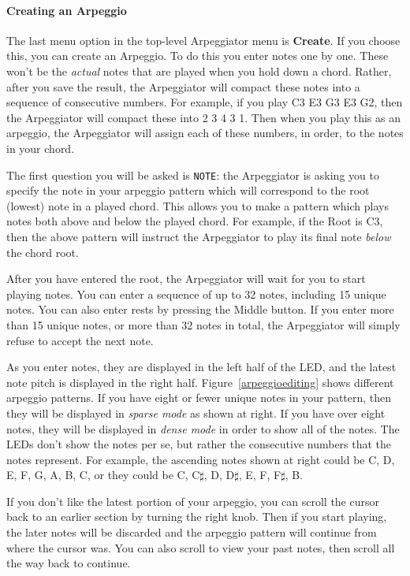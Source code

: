 \documentclass{article}
\begin{document}
\paragraph{Creating an Arpeggio}

The last menu option in the top-level Arpeggiator menu is {\bf Create}.  If you choose this, you can create an Arpeggio.  To do this you enter notes one by one.  These won't be the {\it actual} notes that are played when you hold down a chord.  Rather, after you save the result, the Arpeggiator will compact these notes into a sequence of consecutive numbers.  For example, if you play C3 E3 G3 E3 G2, then the Arpeggiator will compact these into 2 3 4 3 1.  Then when you play this as an arpeggio, the Arpeggiator will assign each of these numbers, in order, to the notes in your chord. 

The first question you will be asked is \texttt{NOTE}: the Arpeggiator is asking you to specify the note in your arpeggio pattern which will correspond to the root (lowest) note in a played chord.  This allows you to make a pattern which plays notes both above and below the played chord.  For example, if the Root is C3, then the above pattern will instruct the Arpeggiator to play its final note {\it below} the chord root.

After you have entered the root, the Arpeggiator will wait for you to start playing notes.  You can enter a sequence of up to 32 notes, including 15 unique notes.  You can also enter rests by pressing the Middle button.  If you enter more than 15 unique notes, or more than 32 notes in total, the Arpeggiator will simply refuse to accept the next note.

As you enter notes, they are displayed in the left half of the LED, and the latest note pitch is displayed in the right half. Figure~\ref{arpeggioediting} shows different arpeggio patterns.  If you have eight or fewer unique notes in your pattern, then they will be displayed in {\it sparse mode} as shown at right.  If you have over eight notes, they will be displayed in {\it dense mode} in order to show all of the notes.  The LEDs don't show the notes per se, but rather the consecutive numbers that the notes represent.  For example, the ascending notes shown at right could be C, D, E, F, G, A, B, C, or they could be C, C\(\sharp\), D, D\(\sharp\), E, F, F\(\sharp\), B.

If you don't like the latest portion of your arpeggio, you can scroll the cursor back to an earlier section by turning the right knob.  Then if you start playing, the later notes will be discarded and the arpeggio pattern will continue from where the cursor was.  You can also scroll to view your past notes, then scroll all the way back to continue.
\end{document}
